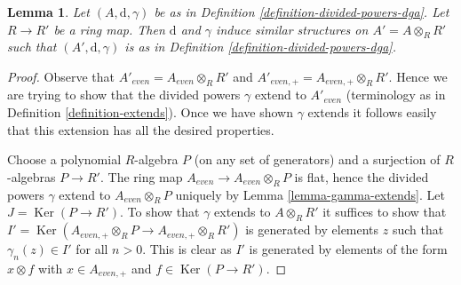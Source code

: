 \documentclass{stacks-project}
\theoremstyle{plain}
\newtheorem{lemma}[subsection]{Lemma}
\theoremstyle{definition}
\theoremstyle{remark}
\numberwithin{equation}{subsection}
\def\Ker{\mathop{\mathrm{Ker}}}
\begin{document}
\begin{lemma}
\label{lemma-base-change-div}
Let $(A, \text{d}, \gamma)$ be as in
Definition \ref{definition-divided-powers-dga}.
Let $R \to R'$ be a ring map.
Then $\text{d}$ and $\gamma$ induce similar structures on
$A' = A \otimes_R R'$ such that $(A', \text{d}, \gamma)$ is as in
Definition \ref{definition-divided-powers-dga}.
\end{lemma}

\begin{proof}
Observe that $A'_{even} = A_{even} \otimes_R R'$ and
$A'_{even, +} = A_{even, +} \otimes_R R'$. Hence we are trying to
show that the divided powers $\gamma$ extend to $A'_{even}$
(terminology as in Definition \ref{definition-extends}).
Once we have shown $\gamma$ extends it follows easily that this
extension has all the desired properties.

\medskip\noindent
Choose a polynomial $R$-algebra $P$ (on any set of generators)
and a surjection of $R$-algebras
$P \to R'$. The ring map $A_{even} \to A_{even} \otimes_R P$ is flat,
hence the divided powers $\gamma$ extend to $A_{even} \otimes_R P$
uniquely by Lemma \ref{lemma-gamma-extends}.
Let $J = \Ker(P \to R')$. To show that $\gamma$ extends
to $A \otimes_R R'$ it suffices to show that
$I' = \Ker(A_{even, +} \otimes_R P \to A_{even, +} \otimes_R R')$
is generated by elements $z$ such that $\gamma_n(z) \in I'$
for all $n > 0$. This is clear as $I'$ is generated by elements
of the form $x \otimes f$ with
$x \in A_{even, +}$ and $f \in \Ker(P \to R')$.
\end{proof}
\end{document}
